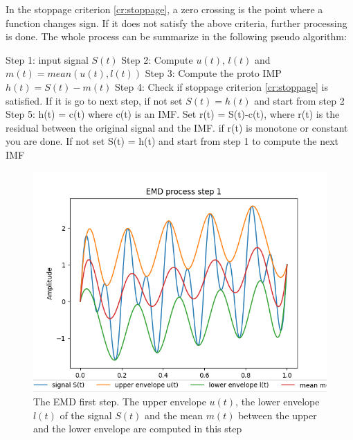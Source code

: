 \documentclass[../Main/thesis.tex]{subfiles}
\begin{document}
In the stoppage criterion \ref{cr:stoppage}, a zero crossing is the point where a function changes sign. If it does not satisfy the above criteria, further processing is done. The whole process can be summarize in the following pseudo algorithm:
\begin{algorithm}
  \begin{algorithmic}[1]
    \STATE Step 1: input signal $S(t)$
    \STATE Step 2: Compute $u(t)$, $l(t)$ and $m(t) = mean(u(t), l(t))$
    \STATE Step 3: Compute the proto IMP $h(t) = S(t) - m(t)$
    \STATE Step 4: Check if stoppage criterion \ref{cr:stoppage} is satisfied. If it is go to next step, if not
    set $S(t) = h(t)$ and start from step 2
      \STATE Step 5: h(t) = c(t) where c(t) is an IMF. Set r(t) = S(t)-c(t), where r(t) is the residual between the original signal and the IMF.
      if r(t) is monotone or constant you are done. If not set S(t) = h(t) and start from step 1 to compute the next IMF
  \end{algorithmic}
\end{algorithm}
\begin{figure}[H] %
   \centering
   \includegraphics[width=6in]{../fig/emd.png} 
   \caption{The EMD first step. The upper envelope $u(t)$, the lower envelope $l(t)$ of the signal $S(t)$ and the mean $m(t)$ between the upper and the lower envelope are computed in this step}
   \label{fig:emd}
\end{figure}
\end{document}
